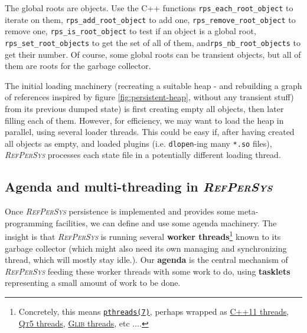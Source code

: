 \documentclass[11pt,a4paper,svgnames]{article}
\newcommand{\RefPerSys}{{\textit{\textsc{RefPerSys}}}}
\begin{document}
The global roots are objects. Use the C++ functions
\texttt{rps\_each\_root\_object} to iterate on them,
\texttt{rps\_add\_root\_object} to add one,
\texttt{rps\_remove\_root\_object} to remove one,
\texttt{rps\_is\_root\_object} to test if an object is a global root,
\texttt{rps\_set\_root\_objects} to get the set of all of them,
and\texttt{rps\_nb\_root\_objects} to get their number. Of course,
some global roots can be transient objects, but all of them are roots
for the garbage collector.

The initial loading machinery (recreating a suitable heap - and
rebuilding a graph of references inspired by figure
\ref{fig:persistent-heap}, without any transient stuff) from its
previous dumped state) is first creating empty all objects, then later
filling each of them. However, for efficiency, we may want to load the
heap in parallel, using several loader threads. This could be easy if,
after having created all objects as empty, and loaded plugins
(i.e. \texttt{dlopen}-ing many \texttt{*.so} files), {\RefPerSys}
processes each state file in a potentially different loading thread.

\bigskip

\subsection{Agenda and multi-threading in \RefPerSys}
\label{subsec:agenda-thread}

Once {\RefPerSys} persistence is implemented and provides some
meta-programming facilities, we can define and use some agenda
machinery. The insight is that {\RefPerSys} is running several
\cite{barney:2010:pthreads, butenhof:1997:programming} \textbf{worker
  threads}\footnote{Concretely, this means
\href{http://man7.org/linux/man-pages/man7/pthreads.7.html}{\texttt{pthreads(7)}},
perhaps wrapped as
\href{https://en.cppreference.com/w/cpp/thread}{\textsc{C++11}
  threads},
\href{https://doc.qt.io/qt-5/thread-basics.html}{\textsc{Qt5}
  threads},
\href{https://developer.gnome.org/glib/stable/glib-Threads.html}{\textsc{Glib}
  threads}, etc ....}  known to its garbage collector (which might
also need its own managing and synchronizing thread, which will mostly
stay idle.). Our \textbf{agenda}  is the central
mechanism of {\RefPerSys} feeding these worker threads with some work
to do, using \textbf{tasklets} representing a small amount of work to
be done.

\medskip
\end{document}
